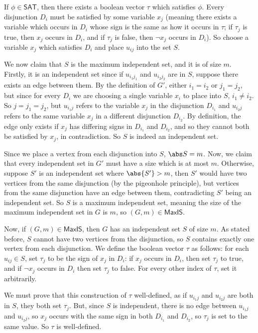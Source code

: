 \documentclass[10pt]{article}
\def\sat{\mathsf{SAT}}
\def\maxIS{\mathsf{MaxIS}}
\begin{document}
    If $\phi\in\sat$, then there exists a boolean vector $\tau$ which satisfies $\phi$.
    Every disjunction $D_i$ must be satisfied by some variable $x_j$ (meaning there exists a variable which occurs in $D_i$ whose sign is the same as how it occurs in $\tau$; if $\tau_j$ is true, then $x_j$
    occurs in $D_i$, and if $\tau_j$ is false, then $\neg x_j$ occurs in $D_i$).
    So choose a variable $x_j$ which satisfies $D_i$ and place $u_{ij}$ into the set $S$.

    We now claim that $S$ is the maximum independent set, and it is of size $m$.
    Firstly, it is an independent set since if $u_{i_1j_1}$ and $u_{i_2j_2}$ are in $S$, suppose there exists an edge between them.
    By the definition of $G'$, either $i_1=i_2$ or $j_1=j_2$, but since for every $D_i$ we are choosing a single variable $x_i$ to place into $S$, $i_1\neq i_2$.
    So $j=j_1=j_2$, but $u_{i_1j}$ refers to the variable $x_j$ in the disjunction $D_{i_1}$ and $u_{i_2j}$ refers to the same variable $x_j$ in a different disjunction $D_{i_2}$.
    By definition, the edge only exists if $x_j$ has differing signs in $D_{i_1}$ and $D_{i_2}$, and so they cannot both be satisfied by $x_j$, in contradiction.
    So $S$ is indeed an independent set.

    Since we place a vertex from each disjunction into $S$, $\abs S=m$.
    Now, we claim that every independent set in $G'$ must have a size which is at most $m$.
    Otherwise, suppose $S'$ is an independent set where $\abs{S'}>m$, then $S'$ would have two vertices from the same disjunction (by the pigeonhole principle), but vertices from the same disjunction have
    an edge between them, contradicting $S'$ being an independent set.
    So $S$ is a maximum independent set, meaning the size of the maximum independent set in $G$ is $m$, so $(G,m)\in\maxIS$.

    Now, if $(G,m)\in\maxIS$, then $G$ has an independent set $S$ of size $m$.
    As stated before, $S$ cannot have two vertices from the disjunction, so $S$ contains exactly one vertex from each disjunction.
    We define the boolean vector $\tau$ as follows: for each $u_{ij}\in S$, set $\tau_j$ to be the sign of $x_j$ in $D_i$: if $x_j$ occurs in $D_i$, then set $\tau_j$ to true, and if $\neg x_j$ occurs in
    $D_i$ then set $\tau_j$ to false.
    For every other index of $\tau$, set it arbitrarily.

    We must prove that this construction of $\tau$ well-defined, as if $u_{i_1j}$ and $u_{i_2j}$ are both in $S$, they both set $\tau_j$.
    But, since $S$ is independent, there is no edge between $u_{i_1j}$ and $u_{i_2j}$, so $x_j$ occurs with the same sign in both $D_{i_1}$ and $D_{i_2}$, so $\tau_j$ is set to the same value.
    So $\tau$ is well-defined.
\end{document}
